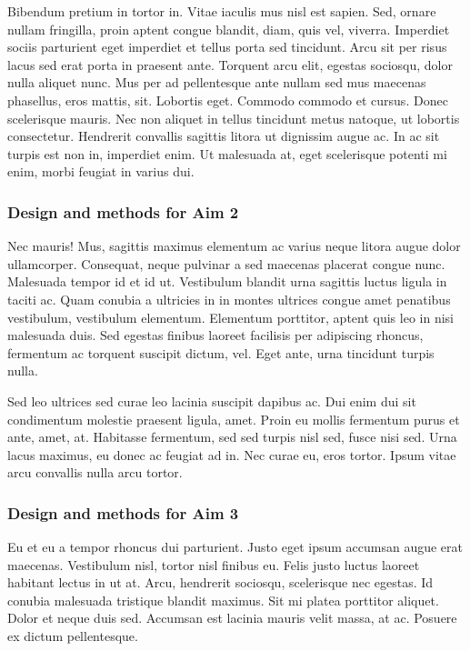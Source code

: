 \documentclass[11pt,]{article}
\begin{document}
Bibendum pretium in tortor in. Vitae iaculis mus nisl est sapien. Sed,
ornare nullam fringilla, proin aptent congue blandit, diam, quis vel,
viverra. Imperdiet sociis parturient eget imperdiet et tellus porta sed
tincidunt. Arcu sit per risus lacus sed erat porta in praesent ante.
Torquent arcu elit, egestas sociosqu, dolor nulla aliquet nunc. Mus per
ad pellentesque ante nullam sed mus maecenas phasellus, eros mattis,
sit. Lobortis eget. Commodo commodo et cursus. Donec scelerisque mauris.
Nec non aliquet in tellus tincidunt metus natoque, ut lobortis
consectetur. Hendrerit convallis sagittis litora ut dignissim augue ac.
In ac sit turpis est non in, imperdiet enim. Ut malesuada at, eget
scelerisque potenti mi enim, morbi feugiat in varius dui.

\hypertarget{design-and-methods-for-aim-2}{%
\subsubsection{Design and methods for Aim
2}\label{design-and-methods-for-aim-2}}

Nec mauris! Mus, sagittis maximus elementum ac varius neque litora augue
dolor ullamcorper. Consequat, neque pulvinar a sed maecenas placerat
congue nunc. Malesuada tempor id et id ut. Vestibulum blandit urna
sagittis luctus ligula in taciti ac. Quam conubia a ultricies in in
montes ultrices congue amet penatibus vestibulum, vestibulum elementum.
Elementum porttitor, aptent quis leo in nisi malesuada duis. Sed egestas
finibus laoreet facilisis per adipiscing rhoncus, fermentum ac torquent
suscipit dictum, vel. Eget ante, urna tincidunt turpis nulla.

Sed leo ultrices sed curae leo lacinia suscipit dapibus ac. Dui enim dui
sit condimentum molestie praesent ligula, amet. Proin eu mollis
fermentum purus et ante, amet, at. Habitasse fermentum, sed sed turpis
nisl sed, fusce nisi sed. Urna lacus maximus, eu donec ac feugiat ad in.
Nec curae eu, eros tortor. Ipsum vitae arcu convallis nulla arcu tortor.

\hypertarget{design-and-methods-for-aim-3}{%
\subsubsection{Design and methods for Aim
3}\label{design-and-methods-for-aim-3}}

Eu et eu a tempor rhoncus dui parturient. Justo eget ipsum accumsan
augue erat maecenas. Vestibulum nisl, tortor nisl finibus eu. Felis
justo luctus laoreet habitant lectus in ut at. Arcu, hendrerit sociosqu,
scelerisque nec egestas. Id conubia malesuada tristique blandit maximus.
Sit mi platea porttitor aliquet. Dolor et neque duis sed. Accumsan est
lacinia mauris velit massa, at ac. Posuere ex dictum pellentesque.
\end{document}
